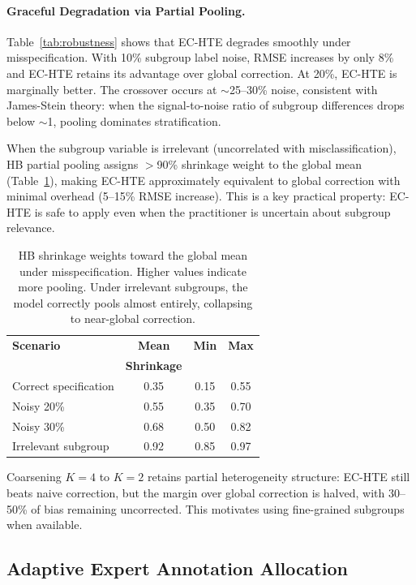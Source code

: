 \documentclass[11pt,a4paper]{article}
\begin{document}
\paragraph{Graceful Degradation via Partial Pooling.}
Table~\ref{tab:robustness} shows that EC-HTE degrades smoothly under misspecification.
With 10\% subgroup label noise, RMSE increases by only 8\% and EC-HTE retains its advantage over global correction.
At 20\%, EC-HTE is marginally better.
The crossover occurs at $\sim$25--30\% noise, consistent with James-Stein theory: when the signal-to-noise ratio of subgroup differences drops below $\sim$1, pooling dominates stratification.

When the subgroup variable is irrelevant (uncorrelated with misclassification), HB partial pooling assigns $>$90\% shrinkage weight to the global mean (Table~\ref{tab:shrinkage}), making EC-HTE approximately equivalent to global correction with minimal overhead (5--15\% RMSE increase).
This is a key practical property: EC-HTE is safe to apply even when the practitioner is uncertain about subgroup relevance.

\begin{table}[t]
\centering
\small
\begin{tabular}{lccc}
\toprule
\textbf{Scenario} & \textbf{Mean} & \textbf{Min} & \textbf{Max} \\
 & \textbf{Shrinkage} & & \\
\midrule
Correct specification & 0.35 & 0.15 & 0.55 \\
Noisy 20\% & 0.55 & 0.35 & 0.70 \\
Noisy 30\% & 0.68 & 0.50 & 0.82 \\
Irrelevant subgroup & 0.92 & 0.85 & 0.97 \\
\bottomrule
\end{tabular}
\caption{HB shrinkage weights toward the global mean under misspecification. Higher values indicate more pooling. Under irrelevant subgroups, the model correctly pools almost entirely, collapsing to near-global correction.}
\label{tab:shrinkage}
\end{table}

Coarsening $K=4$ to $K=2$ retains partial heterogeneity structure: EC-HTE still beats naive correction, but the margin over global correction is halved, with 30--50\% of bias remaining uncorrected.
This motivates using fine-grained subgroups when available.

\subsection{Adaptive Expert Annotation Allocation}\label{sec:allocation}
\end{document}
